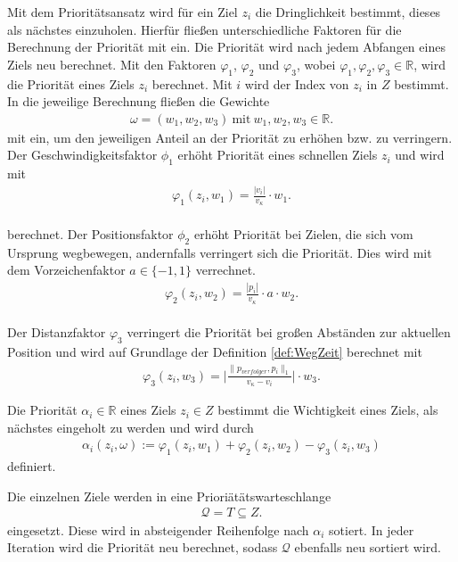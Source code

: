 \documentclass[german,version-2019-11]{uzl-thesis}
\begin{document}
Mit dem Prioritätsansatz wird für ein Ziel $z_i$ die Dringlichkeit bestimmt, dieses als nächstes einzuholen. Hierfür fließen unterschiedliche Faktoren für die Berechnung der Priorität mit ein. Die Priorität wird nach jedem Abfangen eines Ziels neu berechnet. Mit den Faktoren $\varphi_1$, $\varphi_2$ und $\varphi_3$, wobei $\varphi_1,\varphi_2,\varphi_3\in\mathbb{R}$, wird die Priorität eines Ziels $z_i$ berechnet. Mit $i$ wird der Index von $z_i$ in $Z$ bestimmt. In die jeweilige Berechnung fließen die Gewichte
\begin{align*}
\omega = (w_1, w_2 ,w_3)~\text{mit}~w_1,w_2,w_3\in\mathbb{R}.
\end{align*}
mit ein, um den jeweiligen Anteil an der Priorität zu erhöhen bzw. zu verringern.\\
Der Geschwindigkeitsfaktor $\phi_1$ erhöht Priorität eines schnellen Ziels $z_i$ und wird mit 
\begin{align}
\varphi_1(z_i, w_1) = \frac{|v_i|}{v_{\kappa}}\cdot w_1.
\end{align}\\
berechnet.
\label{def:FaktorPos}
Der Positionsfaktor $\phi_2$ erhöht Priorität bei Zielen, die sich vom Ursprung wegbewegen, andernfalls verringert sich die Priorität. Dies wird mit dem Vorzeichenfaktor $a\in\{-1,1\}$ verrechnet.
\begin{align}
\varphi_2(z_i, w_2) = \frac{|p_i|}{v_{\kappa}}\cdot a \cdot w_2.
\end{align}\\
Der Distanzfaktor $\varphi_3$ verringert die Priorität bei großen Abständen zur aktuellen Position und wird auf Grundlage der Definition \ref{def:WegZeit} berechnet mit
\begin{align}
\varphi_3(z_i, w_3) = \bigg\vert\frac{\|p_{verfolger},p_i\|_1}{v_{\kappa}-v_i}\bigg\vert \cdot w_3.
\end{align}
\begin{definition}
Die Priorität $\alpha_i\in\mathbb{R}$ eines Ziels $z_i\in Z$ bestimmt die Wichtigkeit eines Ziels, als nächstes eingeholt zu werden und wird durch
\begin{align*}
\alpha_i(z_i, \omega) := \varphi_1(z_i,w_1) + \varphi_2(z_i,w_2) - \varphi_3(z_i,w_3)
\end{align*}
definiert.
\end{definition}\noindent
Die einzelnen Ziele werden in eine Prioriätätswarteschlange
\begin{align*}
\mathcal{Q} = T\subseteq Z.
\end{align*}
eingesetzt. Diese wird in absteigender Reihenfolge nach $\alpha_i$ sotiert. In jeder Iteration wird die Priorität neu berechnet, sodass $\mathcal{Q}$ ebenfalls neu sortiert wird.
\end{document}
